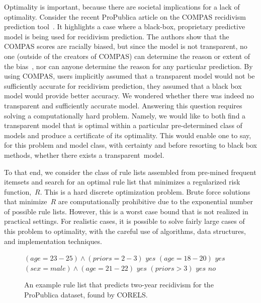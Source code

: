 Optimality is important, because there are societal implications for a lack of optimality.
%
Consider the recent ProPublica article on the COMPAS recidivism prediction tool~\citep{LarsonMaKiAn16}.
%
It highlights a case where a black-box, proprietary predictive model is being used for recidivism prediction.
%
The authors show that the COMPAS scores are racially biased, but since the model is not transparent, no one (outside of the creators of COMPAS) can determine the reason or extent of the bias~\citep{LarsonMaKiAn16}, nor can anyone determine the reason for any particular prediction.
%
By using COMPAS, users implicitly assumed that a transparent model
would not be sufficiently accurate for recidivism prediction,
\ie they assumed that a black box model would provide better accuracy.
%
We wondered whether there was indeed no transparent and sufficiently accurate model.
%
Answering this question requires solving a computationally hard problem.
%
Namely, we would like to both find a transparent model that is optimal
within a particular pre-determined class of models
and produce a certificate of its optimality.
%
This would enable one to say, for this problem and model class,
with certainty and before resorting to black box methods,
whether there exists a transparent~model.

To that end, we consider the class of rule lists assembled from pre-mined frequent itemsets
and search for an optimal rule list that minimizes a regularized risk function,~$R$.
%
This is a hard discrete optimization problem.
%
Brute force solutions that minimize~$R$ are computationally prohibitive
due to the exponential number of possible rule lists.
%
However, this is a worst case bound that is not realized in practical settings.
%
For realistic cases, it is possible to solve fairly large cases of this problem to optimality,
with the careful use of algorithms, data structures, and implementation techniques.

\begin{kdd}
\begin{figure}[b!]
\vspace{-3mm}
\begin{algorithmic}
\normalsize
\State \bif $(age=23-25) \wedge (priors=2-3)$ \bthen $yes$
\State \belif $(age=18-20)$ \bthen $yes$
\State \belif $(sex=male) \wedge (age=21-22)$ \bthen $yes$
\State \belif $(priors>3)$ \bthen $yes$
\State \belse $no$
\end{algorithmic}
\vspace{-3mm}
\caption{An example rule list that predicts two-year recidivism
for the ProPublica dataset, found by CORELS.
}
\label{fig:rule-list}
\end{figure}
\end{kdd}

